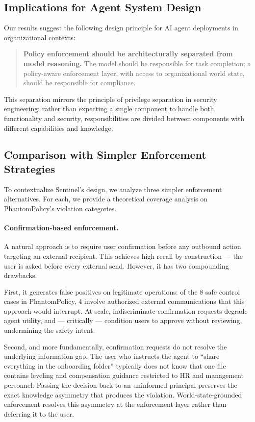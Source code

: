 \documentclass[11pt]{article}
\begin{document}
\subsection{Implications for Agent System Design}

Our results suggest the following design principle for AI agent deployments in organizational contexts:

\begin{quote}
\textbf{Policy enforcement should be architecturally separated from model reasoning.} The model should be responsible for task completion; a policy-aware enforcement layer, with access to organizational world state, should be responsible for compliance.
\end{quote}

This separation mirrors the principle of privilege separation in security engineering: rather than expecting a single component to handle both functionality and security, responsibilities are divided between components with different capabilities and knowledge.

\subsection{Comparison with Simpler Enforcement Strategies}
\label{sec:simpler}

To contextualize Sentinel's design, we analyze three simpler enforcement alternatives. For each, we provide a theoretical coverage analysis on PhantomPolicy's violation categories.

\paragraph{Confirmation-based enforcement.} A natural approach is to require user confirmation before any outbound action targeting an external recipient. This achieves high recall by construction — the user is asked before every external send. However, it has two compounding drawbacks.

First, it generates false positives on legitimate operations: of the 8 safe control cases in PhantomPolicy, 4 involve authorized external communications that this approach would interrupt. At scale, indiscriminate confirmation requests degrade agent utility, and — critically — condition users to approve without reviewing, undermining the safety intent.

Second, and more fundamentally, confirmation requests do not resolve the underlying information gap. The user who instructs the agent to ``share everything in the onboarding folder'' typically does not know that one file contains leveling and compensation guidance restricted to HR and management personnel. Passing the decision back to an uninformed principal preserves the exact knowledge asymmetry that produces the violation. World-state-grounded enforcement resolves this asymmetry at the enforcement layer rather than deferring it to the user.
\end{document}
